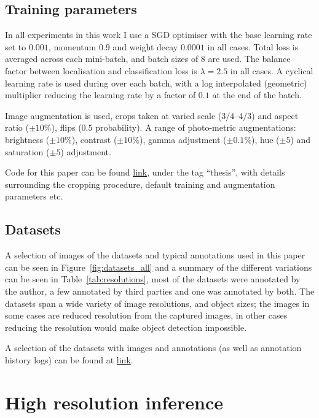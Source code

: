 \documentclass[conference]{IEEEtran}
\begin{document}
\subsection{Training parameters}

In all experiments in this work I use a \gls{SGD} optimiser with the base learning rate set to $0.001$, momentum $0.9$ and weight decay $0.0001$ in all cases. Total loss is averaged across each mini-batch, and batch sizes of $8$ are used. The balance factor between localisation and classification loss is $\lambda=2.5$ in all cases. A cyclical learning rate is used during over each batch, with a log interpolated (geometric) multiplier reducing the learning rate by a factor of $0.1$ at the end of the batch. 

Image augmentation is used, crops taken at varied scale (${3/4}$--${4/3}$) and aspect ratio ($\pm 10\%$), flips ($0.5$ probability). A range of photo-metric augmentations: brightness ($\pm 10\%$), contrast ($\pm 10\%$), gamma adjustment ($\pm 0.1\%$), hue ($\pm 5$) and saturation ($\pm 5$) adjustment.

Code for this paper can be found \href{https://github.com/saulzar/detection/tree/thesis}{link}, under the tag ``thesis'', with details surrounding the cropping procedure, default training and augmentation parameters etc.

\subsection{Datasets}

A selection of images of the datasets and typical annotations used in this paper can be seen in Figure~\ref{fig:datasets_all} and a summary of the different variations can be seen in Table~\ref{tab:resolutions}, most of the datasets were annotated by the author, a few annotated by third parties and one was annotated by both. The datasets span a wide variety of image resolutions, and object sizes; the images in some cases are reduced resolution from the captured images, in other cases reducing the resolution would make object detection impossible.

A selection of the datasets with images and annotations (as well as annotation history logs) can be found at \href{http://academictorrents.com/details/e780e1a9e898e53e72c16cb5fcc6d61d90cc4d27}{link}. 


\section{High resolution inference}
\end{document}

